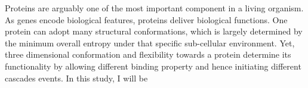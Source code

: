 Proteins are arguably one of the most important component in a living organism. As genes encode biological features, proteins deliver biological functions. One protein can adopt many structural conformations, which is largely determined by the minimum overall entropy under that specific sub-cellular environment. Yet, three dimensional conformation and flexibility towards a protein determine its functionality by allowing different binding property and hence initiating different cascades events. In this study, I will be 